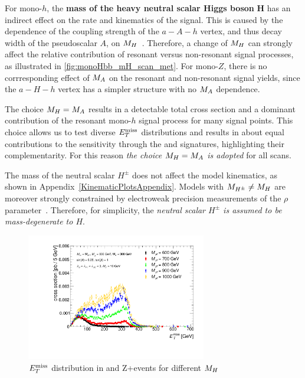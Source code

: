 For mono-$h$, the \textbf{mass of the heavy neutral scalar Higgs boson} $\boldsymbol{H}$ has an indirect effect on the rate and kinematics of the signal. 
This is caused by the dependence of the coupling strength of the $a-A-h$ vertex, and thus decay width of the pseudoscalar $A$, on  $M_{H}$~\cite{Bauer:2017ota}. 
Therefore, a change of $M_{H}$ can strongly affect the relative contribution of resonant versus non-resonant signal processes, as illustrated in \autoref{fig:monoHbb_mH_scan_met}.
For mono-$Z$, there is no corrresponding effect of $M_{A}$ on the resonant and non-resonant signal yields, since the $a-H-h$ vertex has a simpler structure with no $M_{A}$ dependence.

The choice $M_{H} = M_{A}$ results in a detectable total cross section and a dominant contribution of the resonant mono-$h$ signal process for many signal points. 
This choice allows us to test diverse $E_T^\mathrm{miss}$ distributions and results in about equal contributions to the sensitivity through the \monoz and \monoh signatures, highlighting their complementarity. 
For this reason \emph{the choice $M_{H} = M_{A}$ is adopted} for all scans.  

The mass of the neutral scalar $H^{\pm}$ does not affect the model kinematics, as shown in Appendix~\autoref{KinematicPlotsAppendix}.
Models with $M_{H^{\pm}}\neq M_{H}$ are moreover strongly constrained by electroweak precision measurements of the $\rho$ parameter~\cite{Bauer:2017ota}.
Therefore, for simplicity, the \emph{neutral scalar $H^{\pm}$ is assumed to be mass-degenerate to $H$}.


\begin{figure}[!htbp]
	\centering

	\includegraphics[width=0.7\textwidth]{texinputs/04_grid/figures/monoHbb_mH_scan_MET_liny.pdf}
	\caption{The \MET distribution, accounting for the production cross section, of \monohbb signal events for five representative choices of $\mH = \mHc$.
	\label{fig:monoHbb_mH_scan_met}} 
     
	\caption{$E_T^\mathrm{miss}$ distribution in \monohbb and Z+\MET events for different $M_{H}$}
\end{figure}

